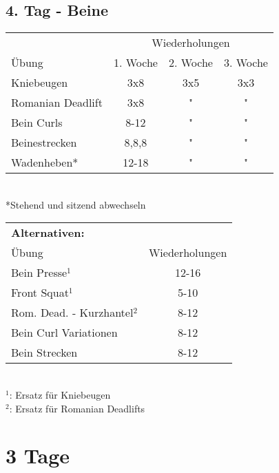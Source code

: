 \documentclass[10pt,a4paper]{article}
\begin{document}
	\subsection{4. Tag - Beine}
		\begin{tabular}{l||c|c|c}
			& \multicolumn{3}{c}{Wiederholungen} \\ 
			Übung & 1. Woche & 2. Woche & 3. Woche \\ 
			\hline
			\hline
			Kniebeugen & 3x8 & 3x5 & 3x3 \\ 
			\hline 
			Romanian Deadlift & 3x8 & " & " \\
			\hline 
			Bein Curls & 8-12 & " & " \\ 
			\hline 
			Beinestrecken & 8,8,8 & " & " \\ 
			\hline
			Wadenheben* & 12-18	& "	& "	\\
		\end{tabular} \\
	*Stehend und sitzend abwechseln
		\vspace{1cm}\\
		\begin{tabular}{lc}
			\multicolumn{2}{l}{\textbf{Alternativen:}}	\\
			Übung	& Wiederholungen	\\
			\hline
			\midrule
			Bein Presse$^{1}$	& 12-16 \\
			Front Squat$^{1}$	& 5-10	\\
			Rom. Dead. - Kurzhantel$^{2}$	& 8-12	\\
			Bein Curl Variationen	& 8-12	\\
			Bein Strecken	& 8-12	\\
			
		\end{tabular}	\\
		$^{1}$: Ersatz für Kniebeugen	\\
		$^{2}$: Ersatz für Romanian Deadlifts
\section{3 Tage}
\end{document}
